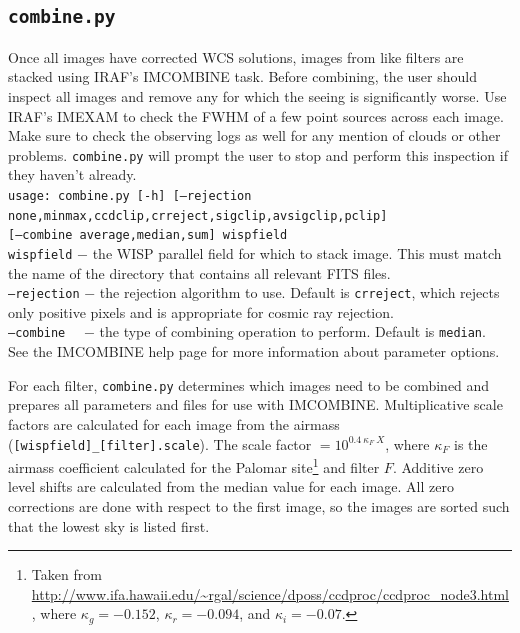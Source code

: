 \documentclass{article}
\begin{document}
\subsection{\texttt{combine.py}}
Once all images have corrected WCS solutions, images from like filters
are stacked using IRAF's IMCOMBINE task. Before combining, the user should
inspect all images and remove any for which the seeing is significantly worse.
Use IRAF's IMEXAM to check the FWHM of a few point sources across each image.
Make sure to check the observing logs as well for any mention of clouds or 
other problems. \texttt{combine.py} will prompt the user to stop and 
perform this inspection if they haven't already. \\

\texttt{usage: combine.py [-h] [--rejection {none,minmax,ccdclip,crreject,sigclip,avsigclip,pclip}] \\
\indent \indent \indent \indent \indent \texttt{[--combine {average,median,sum}] wispfield}} \\

\texttt{wispfield} $-$ \hangindent=2.7cm the WISP parallel field for which 
to stack image. This must match the name of the directory that contains all
relevant FITS files.\\

\texttt{--rejection} $-$ \hangindent=2.7cm the rejection algorithm to use. 
Default is \texttt{crreject}, which rejects only positive pixels and is 
appropriate for cosmic ray rejection. \\

\texttt{--combine} ~~$-$ \hangindent=2.7cm the type of combining operation 
to perform. Default is \texttt{median}. \\

\noindent See the IMCOMBINE help page for more information about parameter 
options.

\noindent For each filter, \texttt{combine.py} determines which images
need to be combined and prepares all parameters and files for use with 
IMCOMBINE. Multiplicative scale factors are calculated for each image
from the airmass (\texttt{[wispfield]\_[filter].scale}). 
The scale factor $=10^{0.4 ~ \kappa_F~ X}$, where $\kappa_F$ is the airmass 
coefficient calculated for the Palomar site\footnote{Taken from 
\url{http://www.ifa.hawaii.edu/~rgal/science/dposs/ccdproc/ccdproc_node3.html}, 
where $\kappa_g = -0.152$, $\kappa_r=-0.094$, and $\kappa_i=-0.07$.} 
and filter $F$.
Additive zero level shifts are calculated from the median value for 
each image. All zero corrections are done with respect to the first image,
so the images are sorted such that the lowest sky is listed first.  \\
\end{document}
